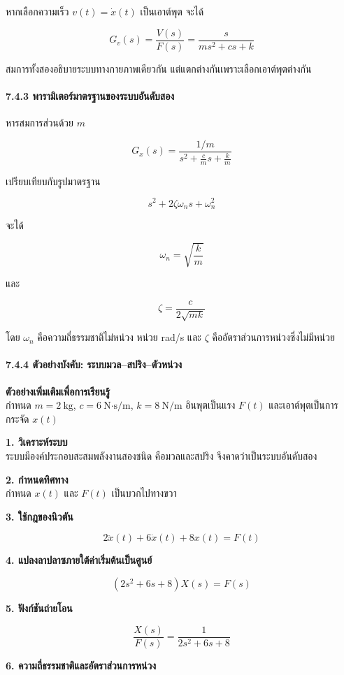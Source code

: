 หากเลือกความเร็ว $v(t)=\dot{x}(t)$ เป็นเอาต์พุต จะได้

\[
G_v(s)=\frac{V(s)}{F(s)}=\frac{s}{ms^2+cs+k}
\]

สมการทั้งสองอธิบายระบบทางกายภาพเดียวกัน แต่แตกต่างกันเพราะเลือกเอาต์พุตต่างกัน

\paragraph{7.4.3 พารามิเตอร์มาตรฐานของระบบอันดับสอง}

หารสมการส่วนด้วย $m$

\[
G_x(s)=\frac{1/m}{s^2+\frac{c}{m}s+\frac{k}{m}}
\]

เปรียบเทียบกับรูปมาตรฐาน

\[
s^2+2\zeta\omega_n s+\omega_n^2
\]

จะได้

\[
\omega_n=\sqrt{\frac{k}{m}}
\]

และ

\[
\zeta=\frac{c}{2\sqrt{mk}}
\]

โดย $\omega_n$ คือความถี่ธรรมชาติไม่หน่วง หน่วย rad/s และ $\zeta$ คืออัตราส่วนการหน่วงซึ่งไม่มีหน่วย

\paragraph{7.4.4 ตัวอย่างบังคับ: ระบบมวล–สปริง–ตัวหน่วง}

\textbf{ตัวอย่างเพิ่มเติมเพื่อการเรียนรู้}\\กำหนด $m=2\ \text{kg}$, $c=6\ \text{N·s/m}$, $k=8\ \text{N/m}$ อินพุตเป็นแรง $F(t)$ และเอาต์พุตเป็นการกระจัด $x(t)$

\textbf{1. วิเคราะห์ระบบ}\\ระบบมีองค์ประกอบสะสมพลังงานสองชนิด คือมวลและสปริง จึงคาดว่าเป็นระบบอันดับสอง

\textbf{2. กำหนดทิศทาง}\\กำหนด $x(t)$ และ $F(t)$ เป็นบวกไปทางขวา

\textbf{3. ใช้กฎของนิวตัน}

\[
2\ddot{x}(t)+6\dot{x}(t)+8x(t)=F(t)
\]

\textbf{4. แปลงลาปลาซภายใต้ค่าเริ่มต้นเป็นศูนย์}

\[
\left(2s^2+6s+8\right)X(s)=F(s)
\]

\textbf{5. ฟังก์ชันถ่ายโอน}

\[
\boxed{\frac{X(s)}{F(s)}=\frac{1}{2s^2+6s+8}}
\]

\textbf{6. ความถี่ธรรมชาติและอัตราส่วนการหน่วง}

